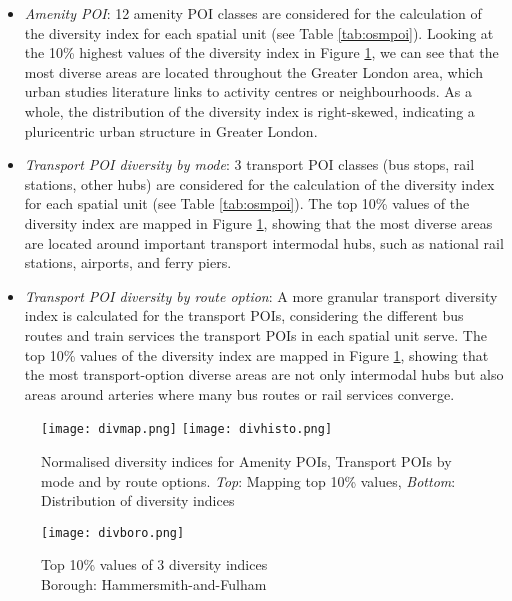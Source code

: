 \begin{itemize}
    \setlength\itemsep{0em}
    \item \textit{Amenity POI}: 12 amenity POI classes are considered for the calculation of the diversity index for each spatial unit (see Table \ref{tab:osmpoi}). Looking at the 10\% highest values of the diversity index in Figure \ref{fig:diversity}, we can see that the most diverse areas are located throughout the Greater London area, which urban studies literature links to activity centres or neighbourhoods. As a whole, the distribution of the diversity index is right-skewed, indicating a pluricentric urban structure in Greater London.
    \item \textit{Transport POI diversity by mode}: 3 transport POI classes (bus stops, rail stations, other hubs) are considered for the calculation of the diversity index for each spatial unit (see Table \ref{tab:osmpoi}). The top 10\% values of the diversity index are mapped in Figure \ref{fig:diversity}, showing that the most diverse areas are located around important transport intermodal hubs, such as national rail stations, airports, and ferry piers.
    \item \textit{Transport POI diversity by route option}: A more granular transport diversity index is calculated for the transport POIs, considering the different bus routes and train services the transport POIs in each spatial unit serve. The top 10\% values of the diversity index are mapped in Figure \ref{fig:diversity}, showing that the most transport-option diverse areas are not only intermodal hubs but also areas around arteries where many bus routes or rail services converge.
\end{itemize}

\begin{figure}[ht]
    \centering
    \texttt{[image: divmap.png]}
    \centering
    \texttt{[image: divhisto.png]}
    \captionsetup{justification=centering}
    \caption{Normalised diversity indices for Amenity POIs, Transport POIs by mode and by route options. \textit{Top}: Mapping top 10\% values, \textit{Bottom}: Distribution of diversity indices}
    \label{fig:diversity}
\end{figure}

\begin{figure}[!hbt]
    \centering
    \texttt{[image: divboro.png]}
    \captionsetup{justification=centering}
    \caption{Top 10\% values of 3 diversity indices\\Borough: Hammersmith-and-Fulham}
    \label{fig:diversityboro}
\end{figure}

